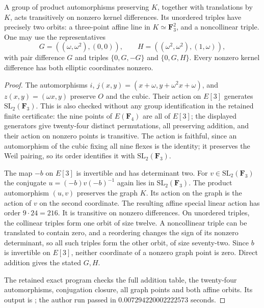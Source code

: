 \begin{lemma}
\label{lem:ss-level3-collision-orbits}
A group of product automorphisms preserving $K$, together with
translations by $K$, acts transitively on nonzero kernel differences.
Its unordered triples have precisely two orbits: a three-point affine
line in $K\simeq\mathbf F_3^2$, and a noncollinear triple.
One may use the representatives
\[
 G=((\omega,\omega^2),(0,0)),\qquad
 H=((\omega^2,\omega^2),(1,\omega)),
\]
with pair difference $G$ and triples $\{0,G,-G\}$ and $\{0,G,H\}$.
Every nonzero kernel difference has both elliptic coordinates nonzero.
\end{lemma}
\begin{proof}
The automorphisms $i$, $j(x,y)=(x+\omega,y+\omega^2x+\omega)$,
and $z(x,y)=(\omega x,y)$ preserve $O$ and the cubic. Their action
on $E[3]$ generates $\mathrm{SL}_2(\mathbf F_3)$.
This is also checked without any group identification in the retained
finite certificate: the nine points of $E(\mathbf F_4)$ are all of
$E[3]$; the displayed generators give twenty-four distinct permutations,
all preserving addition, and their action on nonzero points is transitive.
The action is faithful, since an automorphism of the cubic fixing all
nine flexes is the identity; it preserves the Weil pairing, so its
order identifies it with $\mathrm{SL}_2(\mathbf F_3)$.

The map $-b$ on $E[3]$ is invertible and has determinant two. For
$v\in\mathrm{SL}_2(\mathbf F_3)$ the conjugate
$u=(-b)v(-b)^{-1}$ again lies in $\mathrm{SL}_2(\mathbf F_3)$.
The product automorphism $(u,v)$ preserves the graph $K$.
Its action on the graph is the action of $v$ on the second coordinate.
The resulting affine special linear action has order $9\cdot24=216$.
It is transitive on nonzero differences. On unordered triples, the
collinear triples form one orbit of size twelve. A noncollinear triple
can be translated to contain zero, and a reordering changes the sign
of its nonzero determinant, so all such triples form the other orbit,
of size seventy-two. Since $b$ is invertible on $E[3]$, neither
coordinate of a nonzero graph point is zero. Direct addition gives
the stated $G,H$.

The retained exact program
checks the full addition table, the twenty-four automorphisms, conjugation
closure, all graph points and both affine orbits. Its output is
;
the author run passed in $0.007294220002222573$ seconds.
\end{proof}

